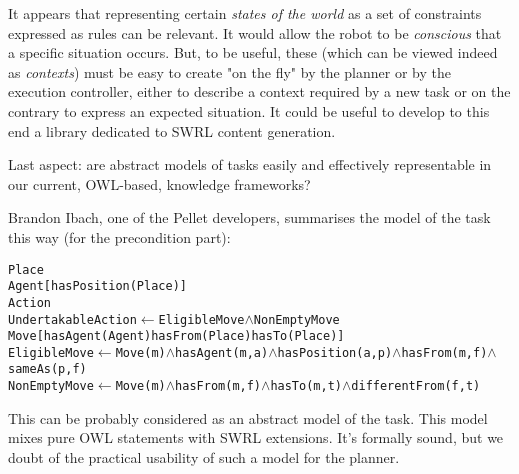 It appears that representing certain \emph{states of the world} as a set of
constraints expressed as rules can be relevant. It would allow the robot to be
\emph{conscious} that a specific situation occurs. But, to be useful, these
 (which can be viewed indeed as \emph{contexts}) must be
easy to create "on the fly" by the planner or by the execution controller,
either to describe a context required by a new task or on the contrary to
express an expected situation. It could be useful to develop to this end a
library dedicated to SWRL content generation.

Last aspect: are abstract models of tasks easily and effectively representable
in our current, OWL-based, knowledge frameworks?

Brandon Ibach, one of the Pellet developers, summarises the model of the 
task this way (for the precondition part):

\begin{alltt}

Place
Agent [ hasPosition(Place) ]
Action
    UndertakableAction \(\leftarrow\) EligibleMove \(\land\) NonEmptyMove
    Move [ hasAgent(Agent) hasFrom(Place) hasTo(Place) ]
        EligibleMove \(\leftarrow\) Move(m) \(\land\) hasAgent(m, a) \(\land\) hasPosition(a, p) \(\land\) hasFrom(m, f) \(\land\)
sameAs(p, f)
        NonEmptyMove \(\leftarrow\) Move(m) \(\land\) hasFrom(m, f) \(\land\) hasTo(m, t) \(\land\) differentFrom(f, t)

\end{alltt}

This can be probably considered as an abstract model of the task. This model
mixes pure OWL statements with SWRL extensions. It's formally sound, but we
doubt of the practical usability of such a model for the planner.

